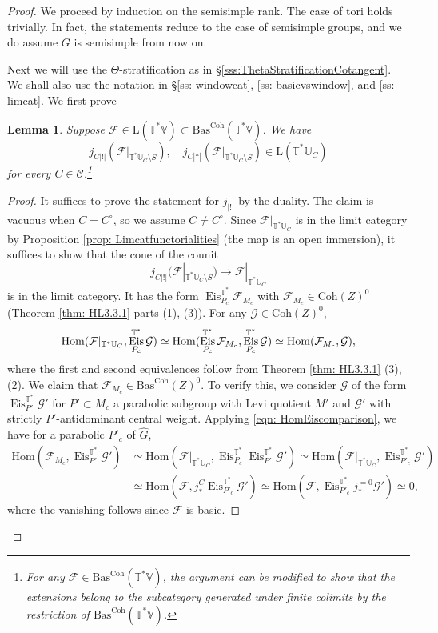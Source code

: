 \documentclass{amsart}
\newtheorem{lemma}[theorem]{Lemma}
\theoremstyle{definition}
\theoremstyle{remark}
\numberwithin{equation}{section}
\newcommand{\U}{\mathbb{U}}
\newcommand{\mc}{\mathcal}
\newcommand{\Hom}{\mathrm{Hom}}
\newcommand{\wh}{\widehat}
\DeclareMathOperator{\Eis}{\mathrm{Eis}}
\newcommand{\Coh}{\mathrm{Coh}}
\newcommand{\V}{\mathbb{V}}
\newcommand{\T}{\mathbb{T}}
\newcommand{\Bas}{\mathrm{Bas}}
\newcommand{\ush}{\lvert ! \rvert}
\newcommand{\mrL}{\mathrm{L}}
\begin{document}
\begin{proof}
We proceed by induction on the semisimple rank. The case of tori holds trivially. In fact, the statements reduce to the case of semisimple groups, and we do assume $G$ is semisimple from now on. 

Next we will use the $\Theta$-stratification as in \S \ref{sss:ThetaStratificationCotangent}. We shall also use the notation in \S \ref{ss: windowcat}, \ref{ss: basicvswindow}, and \ref{ss: limcat}. 
We first prove

\begin{lemma}{\label{lem: limcatlem}}
Suppose $\mc F\in \mrL(\T^*\V)\subset \Bas^\Coh(\T^*\V)$. 
We have 
\[
j_{C\ush}(\mc F|_{\T^* \U_C\setminus S}), \quad j_{C|*|}(\mc F|_{\T^* \U_C\setminus S})\in \mrL (\T^*\U_C)
\]
for every $C\in \mc C$.\footnote{For any $\mc F\in \Bas^\Coh(\T^*\V)$, the argument can be modified to show that the extensions belong to the subcategory generated under finite colimits by the restriction of $\Bas^\Coh(\T^*\V)$.} 
\end{lemma}

\begin{proof}
It suffices to prove the statement for $j_{\ush}$ by the duality. The claim is vacuous when $C= C^\circ$, so we assume $C\neq C^\circ$. Since $\mc F|_{\T^* \U_C}$ is in the limit category by Proposition \ref{prop: Limcatfunctorialities} (the map is an open immersion), it suffices to show that the cone of the counit
\[
j_{C\ush}(\mc F|_{\T^* \U_C\setminus S})\to
\mc F|_{\T^* \U_C}
\] 
is in the limit category. It has the form $\Eis_{P_c}^{\T^*} \mc F_{M_c}$ with $\mc F_{M_c}\in \Coh(Z)^0$ (Theorem \ref{thm: HL3.3.1} parts (1), (3)). For any $\mc G\in \Coh(Z)^0$, 
\begin{equation}{\label{eqn: HomEiscomparison}}
    \Hom(\mc F|_{\T^* \U_C}, \Eis_{P_c}^{\T^*}\mc G)\simeq 
\Hom(\Eis_{P_c}^{\T^*} \mc F_{M_c}, \Eis_{P_c}^{\T^*}\mc G) \simeq
\Hom( \mc F_{M_c}, \mc G), 
\end{equation}
where the first and second equivalences follow from Theorem \ref{thm: HL3.3.1} (3), (2).
We claim that $\mc F_{M_c}\in \Bas^\Coh (Z)^0$. To verify this, we consider $\mc{G}$ of the form $\Eis^{\T^{\ast}}_{P'} \mc{G}'$ for $P' \subset M_c$ a parabolic subgroup with Levi quotient $M'$ and $\mc{G}'$ with strictly $P'$-antidominant central weight. Applying \eqref{eqn: HomEiscomparison}, we have for a parabolic $P'_c$ of $\wh G$,
\begin{align*}
    \Hom( \mc F_{M_c}, \Eis^{\T^{\ast}}_{P'} \mc{G}') &\simeq \Hom(\mc F|_{\T^* \U_C}, \Eis_{P_c}^{\T^*}\Eis^{\T^{\ast}}_{P'} \mc{G}')\simeq \Hom(\mc F|_{\T^* \U_C}, \Eis_{P'_c}^{\T^*} \mc{G}')\\ &\simeq \Hom(\mc F, j^{C }_{\ast}\Eis_{P'_c}^{\T^*} \mc{G}') \simeq \Hom(\mc F, \Eis_{P'_c}^{\T^*} j^{=0}_{\ast}\mc{G}') \simeq 0, 
\end{align*}
where the vanishing follows since $\mc{F}$ is basic.


\end{proof}
\end{proof}
\end{document}
